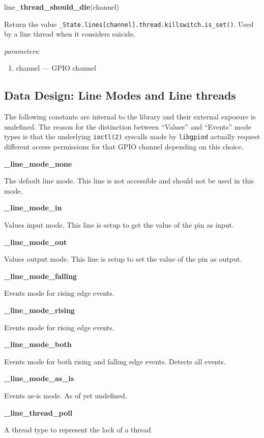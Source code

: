 \documentclass[12pt]{article}
\begin{document}
\noindent line\_\textbf{thread\_should\_die}(channel)

Return the value \texttt{\_State.lines[channel].thread.killswitch.is\_set()}. Used by a line thread when it considers suicide.

\textit{parameters}:
\begin{enumerate}      
        \item channel --- GPIO channel
\end{enumerate}


\subsection{Data Design: Line Modes and Line threads} \label{linemodes}

The following constants are internal to the library and their external exposure is undefined. The reason for the distinction between ``Values'' and ``Events'' mode types is that the underlying \texttt{ioctl(2)} syscalls made by \texttt{libgpiod} actually request different access permissions for that GPIO channel depending on this choice.

\noindent \textbf{\_line\_mode\_none}

The default line mode. This line is not accessible and should not be used in this mode.

\noindent \textbf{\_line\_mode\_in}

Values input mode. This line is setup to get the value of the pin as input.

\noindent \textbf{\_line\_mode\_out}

Values output mode. This line is setup to set the value of the pin as output.

\noindent \textbf{\_line\_mode\_falling}

Events mode for rising edge events.

\noindent \textbf{\_line\_mode\_rising}

Events mode for rising edge events.

\noindent \textbf{\_line\_mode\_both}

Events mode for both rising and falling edge events. Detects all events.

\noindent \textbf{\_line\_mode\_as\_is}

Events as-is mode. As of yet undefined.

\noindent \textbf{\_line\_thread\_poll}

A thread type to represent the lack of a thread
\end{document}
